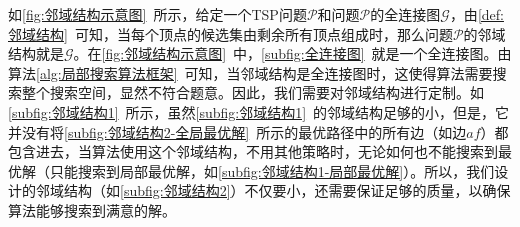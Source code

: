 \par
如\autoref{fig:邻域结构示意图}~所示，给定一个TSP问题$\mathcal{P}$和问题$\mathcal{P}$的全连接图$\mathcal{G}$，由\autoref{def:邻域结构}~可知，当每个顶点的候选集由剩余所有顶点组成时，那么问题$\mathcal{P}$的邻域结构就是$\mathcal{G}$。在\autoref{fig:邻域结构示意图}~中，\autoref{subfig:全连接图}~就是一个全连接图。由算法\ref{alg:局部搜索算法框架}~可知，当邻域结构是全连接图时，这使得算法需要搜索整个搜索空间，显然不符合题意。因此，我们需要对邻域结构进行定制。如\autoref{subfig:邻域结构1}~所示，虽然\autoref{subfig:邻域结构1}~的邻域结构足够的小，但是，它并没有将\autoref{subfig:邻域结构2-全局最优解}~所示的最优路径中的所有边（如边$af$）都包含进去，当算法使用这个邻域结构，不用其他策略时，无论如何也不能搜索到最优解（只能搜索到局部最优解，如\autoref{subfig:邻域结构1-局部最优解}）。所以，我们设计的邻域结构（如\autoref{subfig:邻域结构2}）不仅要小，还需要保证足够的质量，以确保算法能够搜索到满意的解。

